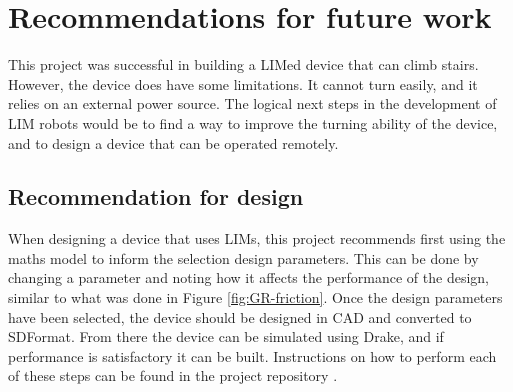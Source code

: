 \chapter{Recommendations for future work}

This project was successful in building a LIMed device that can climb stairs. However, the device does have some limitations. It cannot turn easily, and it relies on an external power source. The logical next steps in the development of LIM robots would be to find a way to improve the turning ability of the device, and to design a device that can be operated remotely. 


\section{Recommendation for design}

When designing a device that uses LIMs, this project recommends first using the maths model to inform the selection design parameters. This can be done by changing a parameter and noting how it affects the performance of the design, similar to what was done in Figure \ref{fig:GR-friction}. Once the design parameters have been selected, the device should be designed in CAD and converted to SDFormat. From there the device can be simulated using Drake, and if performance is satisfactory it can be built. Instructions on how to perform each of these steps can be found in the project repository \citep{repo}.\\
